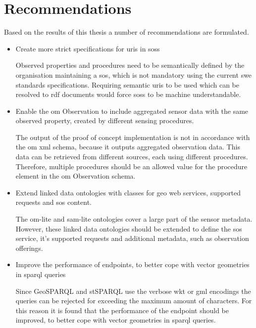 \section{Recommendations}

Based on the results of this thesis a number of recommendations are formulated. 

\begin{itemize}
	\item Create more strict specifications for \acp{uri} in \aclp{sos}
	
	Observed properties and procedures need to be semantically defined by the organisation maintaining a \ac{sos}, which is not mandatory using the current \ac{swe} standards specifications. Requiring semantic \acp{uri} to be used which can be resolved to \ac{rdf} documents would force \aclp{sos} to be machine understandable.
	
	\item Enable the \ac{om} Observation to include aggregated sensor data with the same observed property, created by different sensing procedures. 
	
	The output of the proof of concept implementation is not in accordance with the \ac{om} \ac{xml} schema, because it outputs aggregated observation data. This data can be retrieved from different sources, each using different procedures. Therefore, multiple procedures should be an allowed value for the procedure element in the \ac{om} Observation schema.   
	
	\item Extend linked data ontologies with classes for geo web services, supported requests and \ac{sos} content.
	
	The om-lite and sam-lite ontologies cover a large part of the sensor metadata. However, these linked data ontologies should be extended to define the \ac{sos} service, it's supported requests and additional metadata, such as observation offerings. 
	
	\item Improve the performance of endpoints, to better cope with vector geometries in \ac{sparql} queries
	
	Since GeoSPARQL and stSPARQL use the verbose \ac{wkt} or \ac{gml} encodings the queries can be rejected for exceeding the maximum amount of characters. For this reason it is found that the performance of the endpoint should be improved, to better cope with vector geometries in \ac{sparql} queries. 
	
\end{itemize}




